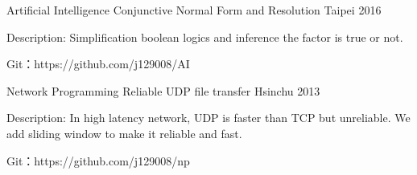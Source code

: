 
\begin{cventries}

  \cventry
    {Artificial Intelligence}
    {Conjunctive Normal Form and Resolution}
    {Taipei} %
    {2016} %
    {
      \begin{cvitems} %
        \item {Description: Simplification boolean logics and inference the factor is true or not.}
        \item {Git：https://github.com/j129008/AI}
      \end{cvitems}
    }


  \cventry
    {Network Programming}
    {Reliable UDP file transfer}
    {Hsinchu} %
    {2013} %
    {
      \begin{cvitems} %
        \item {Description: In high latency network, UDP is faster than TCP but unreliable. We add sliding window to make it reliable and fast.}
        \item {Git：https://github.com/j129008/np}
      \end{cvitems}
    }

\end{cventries}
